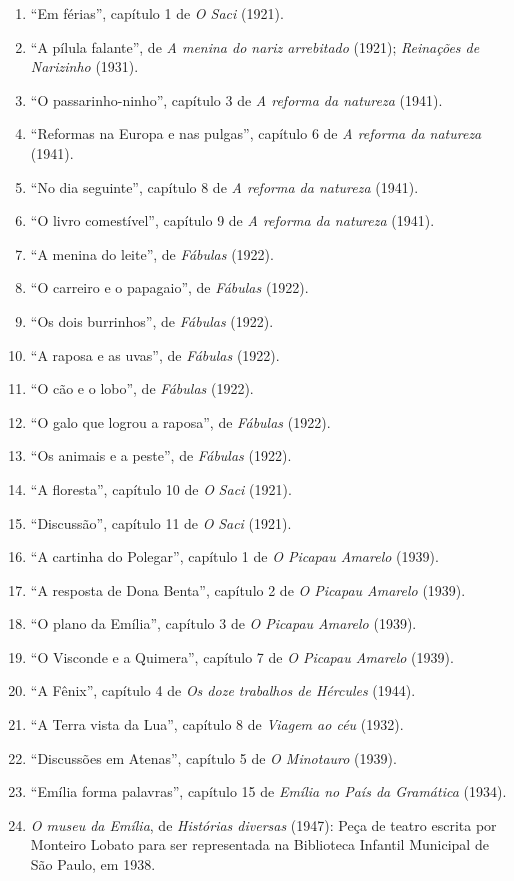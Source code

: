 \begin{enumerate}
\item
  ``Em férias'', capítulo 1 de \textit{O Saci} (1921).
\item
  ``A pílula falante'', de \textit{A menina do nariz arrebitado} (1921);
  \textit{Reinações de Narizinho} (1931).
\item
  ``O passarinho-ninho'', capítulo 3 de \textit{A reforma da natureza} (1941).
\item
  ``Reformas na Europa e nas pulgas'', capítulo 6 de \textit{A reforma da natureza} (1941).
\item
  ``No dia seguinte'', capítulo 8 de \textit{A reforma da natureza} (1941).
\item
  ``O livro comestível'', capítulo 9 de \textit{A reforma da natureza} (1941).
\item
  ``A menina do leite'', de \textit{Fábulas} (1922).
\item
  ``O carreiro e o papagaio'', de \textit{Fábulas} (1922).
\item
  ``Os dois burrinhos'', de \textit{Fábulas} (1922).
\item
  ``A raposa e as uvas'', de \textit{Fábulas} (1922).
\item
  ``O cão e o lobo'', de \textit{Fábulas} (1922).
\item
  ``O galo que logrou a raposa'', de \textit{Fábulas} (1922).
\item
  ``Os animais e a peste'', de \textit{Fábulas} (1922).
\item
  ``A floresta'', capítulo 10 de \textit{O} \textit{Saci} (1921).
\item
  ``Discussão'', capítulo 11 de \textit{O} \textit{Saci} (1921).
\item
  ``A cartinha do Polegar'', capítulo 1 de \textit{O Picapau Amarelo} (1939).
\item
  ``A resposta de Dona Benta'', capítulo 2 de \textit{O Picapau Amarelo} (1939).
\item
  ``O plano da Emília'', capítulo 3 de \textit{O Picapau Amarelo} (1939).
\item
  ``O Visconde e a Quimera'', capítulo 7 de \textit{O Picapau Amarelo} (1939).
\item
  ``A Fênix'', capítulo 4 de \textit{Os doze trabalhos de Hércules} (1944).
\item
  ``A Terra vista da Lua'', capítulo 8 de \textit{Viagem ao céu} (1932).
\item
  ``Discussões em Atenas'', capítulo 5 de \textit{O Minotauro} (1939).
\item
  ``Emília forma palavras'', capítulo 15 de \textit{Emília no País da Gramática} (1934).
\item
  \textit{O museu da Emília}, de \textit{Histórias diversas} (1947): Peça de
  teatro escrita por Monteiro Lobato para ser representada na Biblioteca
  Infantil Municipal de São Paulo, em 1938.
\end{enumerate}